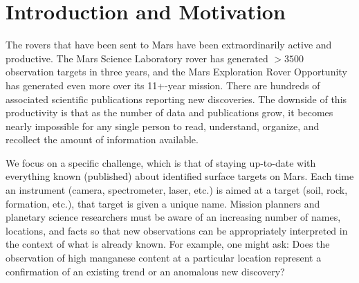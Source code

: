 \documentclass[letterpaper]{article}
\begin{document}
\section{Introduction and Motivation}

The rovers that have been sent to Mars have been extraordinarily
active and productive.  The Mars Science Laboratory rover has
generated $>3500$ observation targets in three years, and the Mars
Exploration Rover Opportunity has generated even more over its
11+-year mission.  There are hundreds of associated scientific
publications reporting new discoveries.  The downside of this
productivity is that as the number of data and publications grow, it
becomes
nearly impossible
for any single person to read, understand, organize, and recollect the
amount of information available.  

We focus on a specific challenge, which is that of staying up-to-date
with everything known (published) about identified surface targets on
Mars.  Each time an instrument (camera, spectrometer, laser, etc.) is
aimed at a target (soil, rock, formation, etc.), that target is given
a unique name.
%
Mission planners and planetary science researchers must be aware of an
increasing number of names, locations, and facts so that new
observations can be appropriately interpreted in the context of what
is already known.  For example, one might ask: Does the observation of
high manganese content at a particular location represent a
confirmation of an existing trend or an anomalous new discovery?
\end{document}
